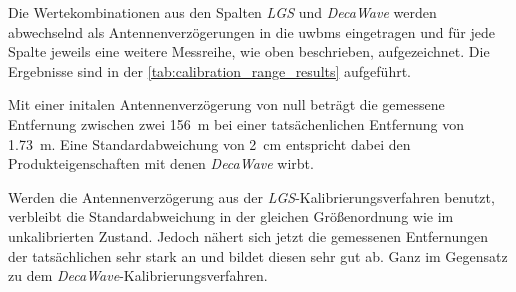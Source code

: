 Die Wertekombinationen aus den Spalten \textit{LGS} und \textit{DecaWave} werden abwechselnd als Antennenverzögerungen in die \Glspl{uwbm} eingetragen und für jede Spalte jeweils eine weitere Messreihe, wie oben beschrieben, aufgezeichnet. Die Ergebnisse sind in der \autoref{tab:calibration_range_results} aufgeführt.

Mit einer initalen Antennenverzögerung von null beträgt die gemessene Entfernung zwischen zwei  \approx \SI{156}{\meter} bei einer tatsächenlichen Entfernung von \approx \SI{1.73}{\meter}. Eine Standardabweichung von \approx \SI{2}{\centi\meter} entspricht dabei den Produkteigenschaften mit denen \textit{DecaWave} wirbt.

Werden die Antennenverzögerung aus der \textit{LGS}-Kalibrierungsverfahren benutzt, verbleibt die Standardabweichung in der gleichen Größenordnung wie im unkalibrierten Zustand. Jedoch nähert sich jetzt die gemessenen Entfernungen der tatsächlichen sehr stark an und bildet diesen sehr gut ab. Ganz im Gegensatz zu dem \textit{DecaWave}-Ka\-li\-brierungs\-ver\-fahren.

